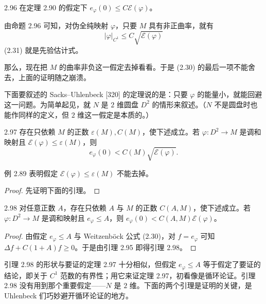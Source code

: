 \begin{proposition}{2.96}
  在定理 2.90 的假定下 $e_\varphi(0)\le C\mathcal{E}(\varphi)$。
\end{proposition}

由命题 2.96 可知，对伪全纯映射 $\varphi$，只要 $M$ 具有非正曲率，就有
\begin{equation}
  |\varphi|_{C^1}\le C\sqrt{\mathcal{E}(\varphi)} \tag{2.31}
\end{equation}
(2.31) 就是先验估计式。


那么，现在把 $M$ 的曲率非负这一假定去掉看看。于是 (2.30) 的最后一项不能舍去，上面的证明随之崩溃。

下面要叙述的 Sacks–Uhlenbeck [320] 的定理说的是：只要 $\varphi$ 的能量小，就能回避这一问题。为简单起见，就 $N$ 是 $2$ 维圆盘 $D^2$ 的情形来叙述。（$N$ 不是圆盘时也能作同样的定义，但 $2$ 维这一假定是本质的。）

\begin{theorem}{2.97}
  存在只依赖 $M$ 的正数 $\varepsilon(M),C(M)$，使下述成立。若 $\varphi\colon D^2\to M$ 是调和映射且 $\mathcal{E}(\varphi)\le\varepsilon(M)$，则
  \[
    e_\varphi(0)<C(M)\sqrt{\mathcal{E}(\varphi)} .
  \]
\end{theorem}

例 2.89 表明假定 $\mathcal{E}(\varphi)\le\varepsilon(M)$ 不能去掉。

\begin{proof}
  先证明下面的引理。
\end{proof}

\begin{lemma*}{2.98}
  对任意正数 $A$，存在只依赖 $A$ 与 $M$ 的正数 $C(A,M)$，使下述成立。若 $\varphi\colon D^2\to M$ 是调和映射且 $e_\varphi\le A$，则 $e_\varphi(0)<C(A,M)\mathcal{E}(\varphi)$。
\end{lemma*}

\begin{proof}
  由假定 $e_\varphi\le A$ 与 Weitzenböck 公式 (2.30)，对 $f=e_\varphi$ 可知 $\Delta f+C(1+A)f\ge0$。于是由引理 2.95 即得引理 2.98。
\end{proof}

引理 2.98 的形状与要证的定理 2.97 十分相似，但假定 $e_\varphi\le A$ 等于假定了要证的结论，即关于 $C^1$ 范数的有界性；用它来证定理 2.97，初看像是循环论证。引理 2.98 没有用到那个重要假定——$N$ 是 $2$ 维。下面的两个引理是证明的关键，是 Uhlenbeck 们巧妙避开循环论证的地方。


